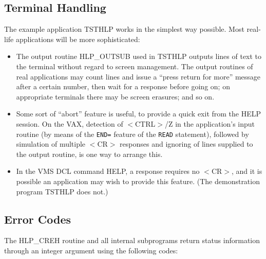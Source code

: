 \subsection{Terminal Handling}
The example application TSTHLP works in the simplest way possible.  Most
real-life applications will be more sophisticated:
\begin{itemize}
\item The output routine HLP\_OUTSUB used in
TSTHLP outputs lines of text to the terminal without
regard to screen management.  The output routines of real
applications may count lines and issue a ``press return for more''
message after a certain number, then wait for a response before going
on; on appropriate terminals there may be screen erasures; and
so on.
\item Some sort of ``abort'' feature is useful, to provide a
quick exit from the HELP session.  On the VAX,
detection of $<$CTRL$>$/Z in the
application's input routine (by means of the \verb|END=| feature
of the \verb|READ| statement), followed by simulation of multiple
$<$CR$>$ responses and ignoring of lines supplied to the output routine, is
one way to arrange this.
\item In the VMS DCL command HELP, a  response requires no
$<$CR$>$, and it is possible an application may wish to provide this
feature.  (The demonstration program TSTHLP does not.)
\end{itemize}

\subsection{Error Codes}
The HLP\_CREH routine and all internal subprograms
return status information through an integer argument using the
following codes:

